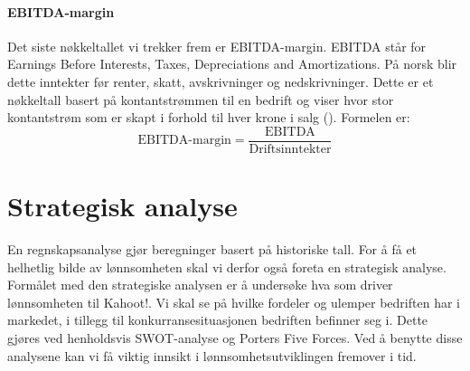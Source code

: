 \paragraph{EBITDA-margin}
Det siste nøkkeltallet vi trekker frem er EBITDA-margin. EBITDA står for Earnings Before Interests, Taxes, Depreciations and Amortizations. På norsk blir dette inntekter før renter, skatt, avskrivninger og nedskrivninger. Dette er et nøkkeltall basert på kontantstrømmen til en bedrift og viser hvor stor kontantstrøm som er skapt i forhold til hver krone i salg (\cite{kristoffersen}). Formelen er:
\hspace{-2em}
\begin{equation}
    \label{eq:EBITDA-margin}
    \boxed{\text{EBITDA-margin}=\frac{\text{EBITDA}}{\text{Driftsinntekter}}}
\end{equation}

\section{Strategisk analyse}
En regnskapsanalyse gjør beregninger basert på historiske tall. For å få et helhetlig bilde av lønnsomheten skal vi derfor også foreta en strategisk analyse. Formålet med den strategiske analysen er å undersøke hva som driver lønnsomheten til Kahoot!. Vi skal se på hvilke fordeler og ulemper bedriften har i markedet, i tillegg til konkurransesituasjonen bedriften befinner seg i. Dette gjøres ved henholdsvis SWOT-analyse og Porters Five Forces. Ved å benytte disse analysene kan vi få viktig innsikt i lønnsomhetsutviklingen fremover i tid. 

